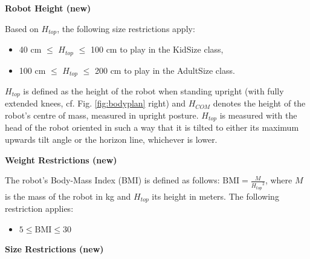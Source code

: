 \bigskip




\bigskip

{\bfseries Robot Height (new)}

\headlinebox

Based on $H_{top}$, the following size restrictions apply:

\begin{itemize}
\item 40 cm ${\leq}$ $H_{top}$ ${\leq}$ 100 cm to play in the KidSize class,
\item 100 cm ${\leq}$ $H_{top}$ ${\leq}$ 200 cm to play in the AdultSize class.
\end{itemize}

$H_{top}$ is defined as the height of the robot when standing upright (with fully extended knees, cf. Fig. \ref{fig:bodyplan} right) and $H_{COM}$ denotes the height of the robot's centre of mass, measured in upright posture. $H_{top}$ is measured with the head of the robot oriented in such a way that it is tilted to either its maximum upwards tilt angle or the horizon line, whichever is lower.

\bigskip

{\bfseries Weight Restrictions (new)}

\headlinebox

The robot's Body-Mass Index (BMI) is defined as follows:
$\mathrm{BMI} = \frac{M}{{H_{top}}^2}$,
where $M$ is the mass of the robot in kg and $H_{top}$ its height in meters.
The following restriction applies:

\begin{itemize}
\item $5 \leq \mathrm{BMI} \leq 30$
\end{itemize}

\bigskip

{\bfseries Size Restrictions (new)}

